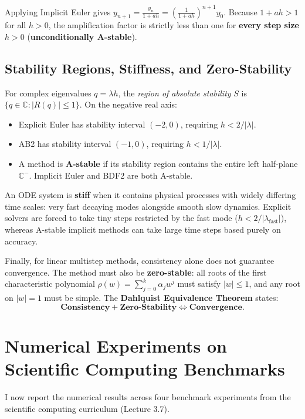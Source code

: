\documentclass[runningheads]{llncs}
\begin{document}
Applying Implicit Euler gives $y_{n+1} = \frac{y_n}{1 + ah} = (\frac{1}{1 + ah})^{n+1} y_0$. Because $1 + ah > 1$ for all $h > 0$, the amplification factor is strictly less than one for \textbf{every step size $h > 0$} (\textbf{unconditionally A-stable}).

\subsection{Stability Regions, Stiffness, and Zero-Stability}
For complex eigenvalues $q = \lambda h$, the \emph{region of absolute stability} $S$ is $\{q \in \mathbb{C} : |R(q)| \le 1\}$. On the negative real axis:
\begin{itemize}
    \item Explicit Euler has stability interval $(-2, 0)$, requiring $h < 2/|\lambda|$.
    \item AB2 has stability interval $(-1, 0)$, requiring $h < 1/|\lambda|$.
    \item A method is \textbf{A-stable} if its stability region contains the entire left half-plane $\mathbb{C}^-$. Implicit Euler and BDF2 are both A-stable.
\end{itemize}

An ODE system is \textbf{stiff} when it contains physical processes with widely differing time scales: very fast decaying modes alongside smooth slow dynamics. Explicit solvers are forced to take tiny steps restricted by the fast mode ($h < 2/|\lambda_{\text{fast}}|$), whereas A-stable implicit methods can take large time steps based purely on accuracy.

Finally, for linear multistep methods, consistency alone does not guarantee convergence. The method must also be \textbf{zero-stable}: all roots of the first characteristic polynomial $\rho(w) = \sum_{j=0}^k \alpha_j w^j$ must satisfy $|w| \le 1$, and any root on $|w| = 1$ must be simple. The \textbf{Dahlquist Equivalence Theorem} states:
\begin{equation}
\label{eq:dahlquist}
\textbf{Consistency} + \textbf{Zero-Stability} \iff \textbf{Convergence}.
\end{equation}

\section{Numerical Experiments on Scientific Computing Benchmarks}
\label{sec:experiments}
I now report the numerical results across four benchmark experiments from the scientific computing curriculum (Lecture 3.7).
\end{document}
